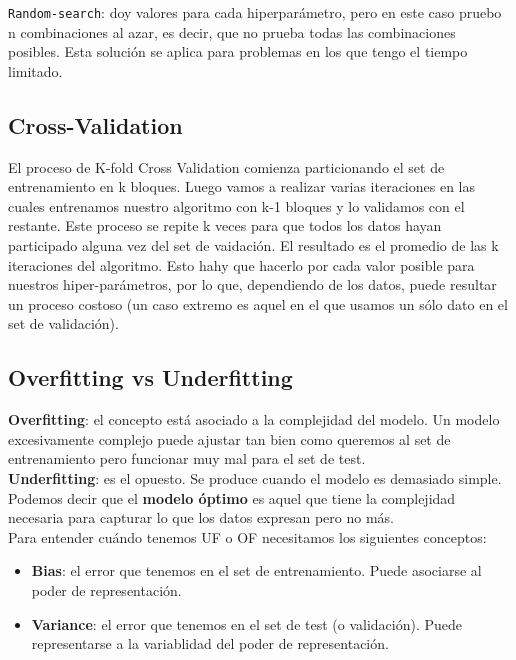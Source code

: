 \documentclass[titlepage,a4paper]{article}
\begin{document}
\texttt{Random-search}: doy valores para cada hiperparámetro, pero en este caso pruebo n combinaciones al azar, es decir, que no prueba todas las combinaciones posibles. Esta solución se aplica para problemas en los que tengo el tiempo limitado.

\subsection*{Cross-Validation}
El proceso de K-fold Cross Validation comienza particionando el set de entrenamiento en k bloques. Luego vamos a realizar varias iteraciones en las cuales entrenamos nuestro algoritmo con k-1 bloques y lo validamos con el restante. Este proceso se repite k veces para que todos los datos hayan participado alguna vez del set de vaidación. El resultado es el promedio de las k iteraciones del algoritmo. Esto hahy que hacerlo por cada valor posible para nuestros hiper-parámetros, por lo que, dependiendo de los datos, puede resultar un proceso costoso (un caso extremo es aquel en el que usamos un sólo dato en el set de validación). 

\subsection*{Overfitting vs Underfitting}
\textbf{Overfitting}: el concepto está asociado a la complejidad del modelo. Un modelo excesivamente complejo puede ajustar tan bien como queremos al set de entrenamiento pero funcionar muy mal para el set de test. \\

\textbf{Underfitting}: es el opuesto. Se produce cuando el modelo es demasiado simple.\\

Podemos decir que el \textbf{modelo óptimo} es aquel que tiene la complejidad necesaria para capturar lo que los datos expresan pero no más. \\

Para entender cuándo tenemos UF o OF necesitamos los siguientes conceptos: 
\begin{itemize}
\item \textbf{Bias}: el error que tenemos en el set de entrenamiento.  Puede asociarse al poder de representación.  
\item \textbf{Variance}: el error que tenemos en el set de test (o validación). Puede representarse a la variablidad del poder de representación. 
\end{itemize}
\end{document}
